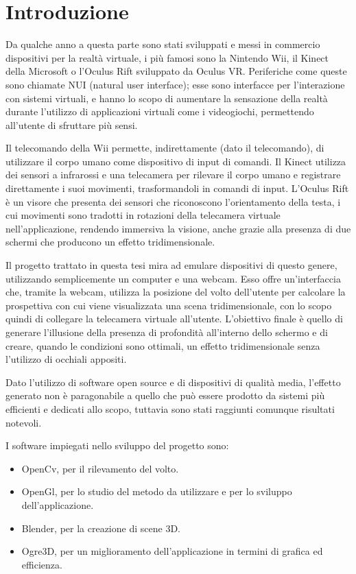 
\chapter*{Introduzione}

Da qualche anno a questa parte sono stati sviluppati e messi in commercio dispositivi per la realtà virtuale, i più famosi sono la Nintendo Wii, il Kinect della Microsoft o l'Oculus Rift sviluppato da Oculus VR. Periferiche come queste sono chiamate NUI (natural user interface); esse  sono interfacce per l'interazione con sistemi virtuali, e hanno lo scopo di aumentare la sensazione della realtà durante l'utilizzo di applicazioni virtuali come i videogiochi, permettendo all'utente di sfruttare più sensi.

Il telecomando della Wii permette, indirettamente (dato il telecomando), di utilizzare il corpo umano come dispositivo di input di comandi. Il Kinect utilizza dei sensori a infrarossi e una telecamera per rilevare il corpo umano e registrare direttamente i suoi movimenti, trasformandoli in comandi di input. L'Oculus Rift è un visore che presenta dei sensori che riconoscono l'orientamento della testa, i cui movimenti sono tradotti in rotazioni della telecamera virtuale nell'applicazione, rendendo immersiva la visione, anche grazie alla presenza di due schermi che producono un effetto tridimensionale.

Il progetto trattato in questa tesi mira ad emulare dispositivi di questo genere, utilizzando semplicemente un computer e una webcam. Esso offre un'interfaccia che, tramite la webcam, utilizza la posizione del volto dell'utente per calcolare la prospettiva con cui viene visualizzata una scena tridimensionale, con lo scopo quindi di collegare la telecamera virtuale all'utente. L'obiettivo finale è quello di generare l'illusione della presenza di profondità all'interno dello schermo e di creare, quando le condizioni sono ottimali, un effetto tridimensionale senza l'utilizzo di occhiali appositi.

Dato l'utilizzo di software open source e di dispositivi di qualità media, l'effetto generato non è paragonabile a quello che può essere prodotto da sistemi più efficienti e dedicati allo scopo, tuttavia sono stati raggiunti comunque risultati notevoli.

I software impiegati nello sviluppo del progetto sono:
\begin{itemize}
\item OpenCv, per il rilevamento del volto.
\item OpenGl, per lo studio del metodo da utilizzare e per lo sviluppo dell'applicazione.
\item Blender, per la creazione di scene 3D.
\item Ogre3D, per un miglioramento dell'applicazione in termini di grafica ed efficienza.
\end{itemize}


